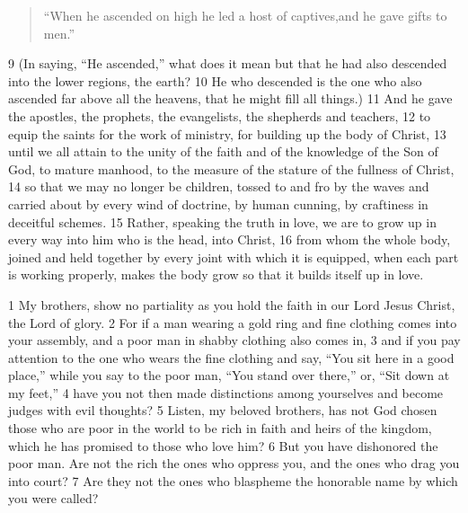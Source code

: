 \begin{bible}
\begin{quote}
``When he ascended on high he led a host of captives,and he gave gifts to men.''
\end{quote}

9 (In saying, ``He ascended,'' what does it mean but that he had also descended into the lower regions, the earth? 10 He who descended is the one who also ascended far above all the heavens, that he might fill all things.) 11 And he gave the apostles, the prophets, the evangelists, the shepherds and teachers, 12 to equip the saints for the work of ministry, for building up the body of Christ, 13 until we all attain to the unity of the faith and of the knowledge of the Son of God, to mature manhood, to the measure of the stature of the fullness of Christ, 14 so that we may no longer be children, tossed to and fro by the waves and carried about by every wind of doctrine, by human cunning, by craftiness in deceitful schemes. 15 Rather, speaking the truth in love, we are to grow up in every way into him who is the head, into Christ, 16 from whom the whole body, joined and held together by every joint with which it is equipped, when each part is working properly, makes the body grow so that it builds itself up in love.

1 My brothers, show no partiality as you hold the faith in our Lord Jesus Christ, the Lord of glory. 2 For if a man wearing a gold ring and fine clothing comes into your assembly, and a poor man in shabby clothing also comes in, 3 and if you pay attention to the one who wears the fine clothing and say, ``You sit here in a good place,'' while you say to the poor man, ``You stand over there,'' or, ``Sit down at my feet,'' 4 have you not then made distinctions among yourselves and become judges with evil thoughts? 5 Listen, my beloved brothers, has not God chosen those who are poor in the world to be rich in faith and heirs of the kingdom, which he has promised to those who love him? 6 But you have dishonored the poor man. Are not the rich the ones who oppress you, and the ones who drag you into court? 7 Are they not the ones who blaspheme the honorable name by which you were called?

\end{bible}

